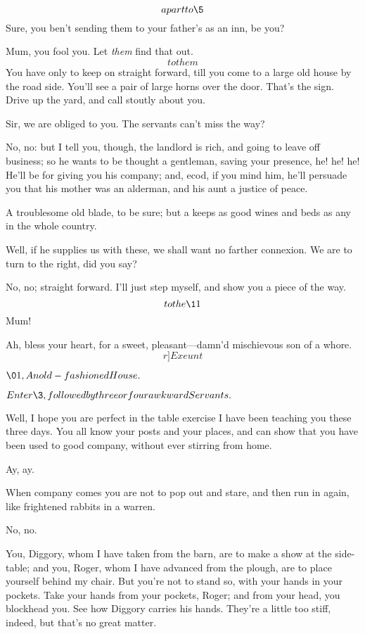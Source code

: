 \documentclass{book}
\begin{document}
 \[apart to \5\]  Sure, you ben't sending them to your
father's as an inn, be you?

\5  Mum, you fool you.  Let \textit{them} find that out. \[to them\]  You
have only to keep on straight forward, till you come to a large old
house by the road side.  You'll see a pair of large horns over the
door.  That's the sign.  Drive up the yard, and call stoutly about you.

\4  Sir, we are obliged to you.  The servants can't miss the
way?

\5  No, no: but I tell you, though, the landlord is rich, and going
to leave off business; so he wants to be thought a gentleman, saving
your presence, he! he! he!  He'll be for giving you his company; and,
ecod, if you mind him, he'll persuade you that his mother was an
alderman, and his aunt a justice of peace.

  A troublesome old blade, to be sure; but a keeps as good
wines and beds as any in the whole country.

\2  Well, if he supplies us with these, we shall want no farther
connexion.  We are to turn to the right, did you say?

\5  No, no; straight forward.  I'll just step myself, and show you a
piece of the way.  \[to the \11\]  Mum!

 Ah, bless your heart, for a sweet, pleasant---damn'd
mischie\-vous  son of a whore. \[r]Exeunt\]



\Act


\(\01, An old-fashioned House.\)


\(Enter \3, followed by three or four awkward Servants.\)


\3  Well, I hope you are perfect in the table exercise I have
been teaching you these three days.  You all know your posts and your
places, and can show that you have been used to good company, without
ever stirring from home.

  Ay, ay.

\3  When company comes you are not to pop out and stare, and
then run in again, like frightened rabbits in a warren.

  No, no.

\3  You, Diggory, whom I have taken from the barn, are to make
a show at the side-table; and you, Roger, whom I have advanced from the
plough, are to place yourself behind my chair.  But you're not to stand
so, with your hands in your pockets.  Take your hands from your
pockets, Roger; and from your head, you blockhead you.  See how Diggory
carries his hands.  They're a little too stiff, indeed, but that's no
great matter.
\end{document}
